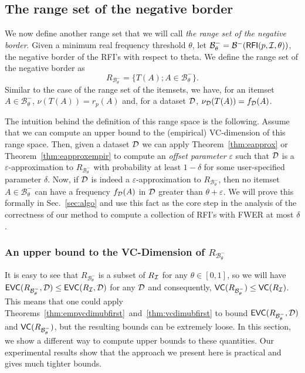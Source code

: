 \subsection{The range set of the negative border}\label{sec:rangenegbord}
We now define another range set that we will call \emph{the range set of the
negative border}. Given a minimum real frequency
threshold $\theta$, let
$\mathcal{B}^-_\theta=\mathcal{B}^-(\mathsf{RFI}(p,{\cal I},\theta))$, the negative border
of the RFI's with respect to theta. We define the range set of the negative
border as
\[R_{\mathcal{B}^-_\theta}=\{T(A); A\in\mathcal{B}^-_\theta\}.\] 
Similar to the case of the range set of the itemsets, we have, for an itemset
$A\in\mathcal{B}^-_\theta$, $\nu(T(A))=r_p(A)$ and, for a dataset ${\cal D}$,
$\nu_{\cal D}(T(A))=f_{\cal D}(A)$.

The intuition behind the definition of this range space is the following.
Assume that we can compute an upper bound to the (empirical) VC-dimension of
this range space. Then, given a dataset ${\cal D}$ we can apply Theorem~\ref{thm:eapprox}
or Theorem~\ref{thm:eapproxempir} to compute an \emph{offset
parameter} $\varepsilon$ such that ${\cal D}$ is a $\varepsilon$-approximation to
$R_{\mathcal{B}^-_\theta}$ with probability at least $1-\delta$ for some
user-specified parameter $\delta$. Now, if ${\cal D}$ is indeed a
$\varepsilon$-approximation to $R_{\mathcal{B}^-_\theta}$, then no itemset
$A\in\mathcal{B}^-_\theta$ can have a frequency $f_{\cal D}(A)$ in ${\cal D}$ greater than
$\theta+\varepsilon$. We will prove this formally in Sec.~\ref{sec:algo} and
use this fact as the core step in the analysis of the correctness of our method
to compute a collection of RFI's with FWER at most $\delta$.

\subsubsection{An upper bound to the VC-Dimension of
$R_{\mathcal{B}^-_\theta}$}\label{sec:bindexub}
It is easy to see that $R_{\mathcal{B}^-_\theta}$ is a subset of $R_{\cal I}$ for
any $\theta\in[0,1]$, so we will have
$\mathsf{EVC}(R_{\mathcal{B}^-_\theta},{\cal D})\le\mathsf{EVC}(R_{\cal I},{\cal D})$ for any ${\cal D}$ and
consequently, $\mathsf{VC}(R_{\mathcal{B}^-_\theta})\le\mathsf{VC}(R_{\cal I})$. This means that one
could apply Theorems~\ref{thm:empvcdimubfirst}~and~\ref{thm:vcdimubfirst} to
bound $\mathsf{EVC}(R_{\mathcal{B}^-_\theta},{\cal D})$ and $\mathsf{VC}(R_{\mathcal{B}^-_\theta})$,
but the resulting bounds can be extremely loose. In this section, we show a
different way to compute upper bounds to these quantities. Our experimental
results show that the approach we present here is practical and gives much
tighter bounds.

